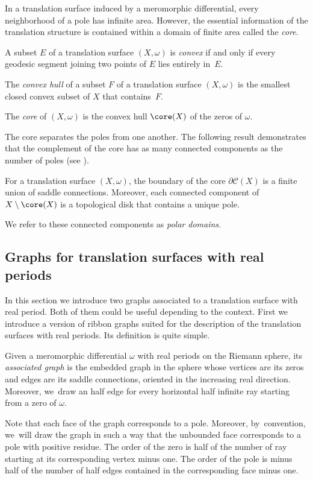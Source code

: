 In a translation surface induced by a meromorphic differential, every neighborhood of a pole has infinite area. However, the essential information of the translation structure is contained within a domain of finite area called the \textit{core}.

\begin{defn}\label{defn:core}
A subset $E$ of a translation surface $(X,\omega)$ is \textit{convex} if and only if every geodesic segment joining two points of $E$ lies entirely in~$E$.

The \textit{convex hull} of a subset $F$ of a translation surface $(X,\omega)$ is the smallest closed convex subset of $X$ that contains~$F$.

The \textit{core} of $(X,\omega)$ is the convex hull $\core(X)$ of the zeros of $\omega$.
\end{defn}

The core separates the poles from one another. The following result demonstrates that the complement of the core has as many connected components as the number of poles (see \cite[Prop.\,4.4 \& Lem.\,4.5]{tahar}).

\begin{prop}\label{prop:decomppoles}
For a translation surface $(X,\omega)$, the boundary of the core $\partial\mathcal{C}(X)$ is a finite union of saddle connections. Moreover, each connected component of $X \setminus\nobreak \core(X)$ is a topological disk that contains a unique pole.
\end{prop}
We refer to these connected components as \textit{polar domains}.

\subsection{Graphs for translation surfaces with real periods}\label{sub:RealGraph}
In this section we introduce two graphs associated to a translation surface with real period. Both of them could be useful depending to the context. First we introduce a version of ribbon graphs suited for the description of the translation surfaces with real periods. Its definition is quite simple.
\begin{defn}
Given a meromorphic differential $\omega$ with real periods on the Riemann sphere, its \textit{associated graph} is the embedded graph in the sphere whose vertices are its zeros and edges are its saddle connections, oriented in the increasing real direction. Moreover, we~draw an half edge for every horizontal half infinite ray starting from a zero of $\omega$.
\end{defn}
Note that each face of the graph corresponds to a pole. Moreover, by~convention, we~will draw the graph in such a way that the unbounded face corresponds to a pole with positive residue. The order of the zero is half of the number of ray starting at its corresponding vertex minus one. The order of the pole is minus half of the number of half edges contained in the corresponding face minus one.

